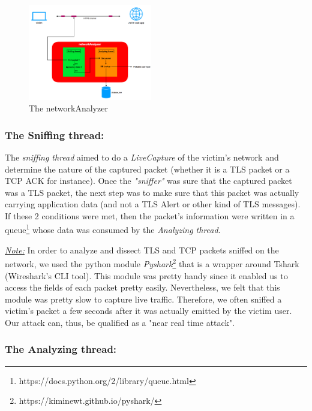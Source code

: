 \documentclass[journal]{IEEEtran}
\begin{document}
\begin{figure}[h]
\centering
\includegraphics[width=0.48\textwidth]{images/networkAnalyzer.png}
\caption{The networkAnalyzer}
\label{fig:networkAnalyzer}
\end{figure}

\bigskip
\subsubsection*{The Sniffing thread:}
The \emph{sniffing thread} aimed to do a \emph{LiveCapture} of the victim's network and determine the nature of the captured packet (whether it is a TLS packet or a TCP ACK for instance). Once the \emph{"sniffer"} was sure that the captured packet was a TLS packet, the next step was to make sure that this packet was actually carrying application data (and not a TLS Alert or other kind of TLS messages). If these 2 conditions were met, then the packet's information were written in a queue\footnote{https://docs.python.org/2/library/queue.html} whose data was consumed by the \emph{Analyzing thread}. 

\medskip

\emph{\underline{Note:}} In order to analyze and dissect TLS and TCP packets sniffed on the network, we used the python module \emph{Pyshark}\footnote{https://kiminewt.github.io/pyshark/} that is a wrapper around Tshark (Wireshark's CLI tool). This module was pretty handy since it enabled us to access the fields of each packet pretty easily. Nevertheless, we felt that this module was pretty slow to capture live traffic. Therefore, we often sniffed a victim's packet a few seconds after it was actually emitted by the victim user. Our attack can, thus, be qualified as a "near real time attack".

\bigskip
\subsubsection*{The Analyzing thread:}
\end{document}
